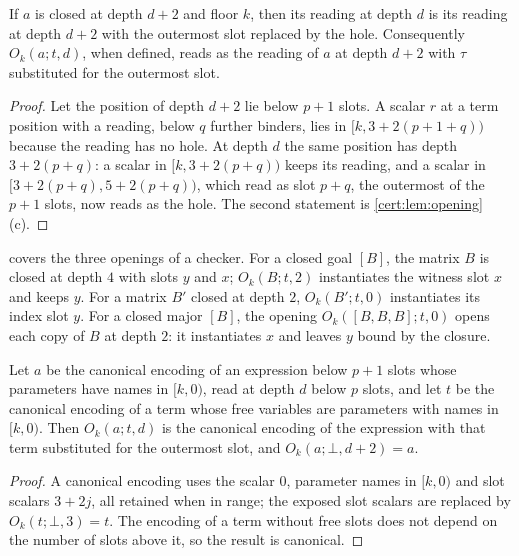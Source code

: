 \begin{lemma}\label{cert:lem:exposure}
If $a$ is closed at depth $d+2$ and floor $k$, then its reading at depth
$d$ is its reading at depth $d+2$ with the outermost slot replaced by the hole.
Consequently $O_k(a;t,d)$, when defined, reads as the reading of $a$ at depth
$d+2$ with $\tau$ substituted for the outermost slot.
\end{lemma}
\begin{proof}
Let the position of depth $d+2$ lie below $p+1$ slots. A scalar $r$ at a term
position with a reading, below $q$ further binders, lies in
$[k,3+2(p+1+q))$ because the reading has no hole. At
depth $d$ the same position has depth $3+2(p+q)$: a scalar in $[k,3+2(p+q))$
keeps its reading, and a scalar in $[3+2(p+q),5+2(p+q))$, which read as slot
$p+q$, the outermost of the $p+1$ slots, now reads as the hole. The second
statement is \cref{cert:lem:opening}(c).
\end{proof}

 covers the three openings of a checker. For a
closed goal $[B]$, the matrix $B$ is closed at depth $4$ with slots $y$
and $x$; $O_k(B;t,2)$ instantiates the witness slot $x$ and keeps $y$. For a
matrix $B'$ closed at depth $2$, $O_k(B';t,0)$ instantiates its index slot
$y$. For a closed major $[B]$, the opening $O_k([B,B,B];t,0)$ opens each
copy of $B$ at depth $2$: it instantiates $x$ and leaves $y$ bound by the
closure.

\begin{lemma}\label{cert:lem:canonical}
Let $a$ be the canonical encoding of an expression below $p+1$ slots whose
parameters have names in $[k,0)$, read at
depth $d$ below $p$ slots, and let $t$ be the canonical encoding of a term
whose free variables are parameters with names in $[k,0)$. Then $O_k(a;t,d)$
is the canonical encoding of the expression with that term substituted for the
outermost slot, and $O_k(a;\bot,d+2)=a$.
\end{lemma}
\begin{proof}
A canonical encoding uses the scalar $0$, parameter names in $[k,0)$ and slot
scalars $3+2j$, all retained when in range; the exposed slot scalars are
replaced by $O_k(t;\bot,3)=t$. The encoding of a term without free slots does
not depend on the number of slots above it, so the result is canonical.
\end{proof}

